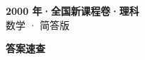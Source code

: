 \documentclass[zihao=-4, a4paper]{ctexart}
\begin{document}
\begin{center}
  {\Large\bfseries 2000 年·全国新课程卷·理科}\\[4pt]
  {\large 数学 · 简答版}
\end{center}
\medskip
{}

\clearpage
{}
\begin{center}{\Large\bfseries 答案速查}\end{center}
\medskip

\end{document}
